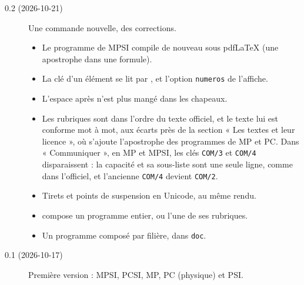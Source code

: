 \documentclass[a4paper,11pt]{article}
\begin{document}
\begin{description}
  \item[0.2 (2026-10-21)] Une commande nouvelle, des corrections.
    \begin{itemize}
      \item Le programme de MPSI compile de nouveau sous pdfLaTeX (une
        apostrophe dans une formule).
      \item La clé d'un élément se lit par ,
        et l'option \texttt{numeros} de  l'affiche.
      \item L'espace après  n'est plus mangé dans les
        chapeaux.
      \item Les rubriques sont dans l'ordre du texte officiel, et le texte lui
        est conforme mot à mot, aux écarts près de la section « Les textes et
        leur licence », où s'ajoute l'apostrophe des programmes de MP et PC. Dans « Communiquer », en MP et MPSI, les clés
        \texttt{COM/3} et \texttt{COM/4} disparaissent : la capacité et sa
        sous-liste sont une seule ligne, comme dans l'officiel, et l'ancienne
        \texttt{COM/4} devient \texttt{COM/2}.
      \item Tirets et points de suspension en Unicode, au même rendu.
      \item {} compose un programme entier, ou l'une de ses
        rubriques.
      \item Un programme composé par filière, dans \texttt{doc}.
    \end{itemize}
  \item[0.1 (2026-10-17)] Première version : MPSI, PCSI, MP, PC (physique) et
    PSI.
\end{description}

\printindex
\end{document}
